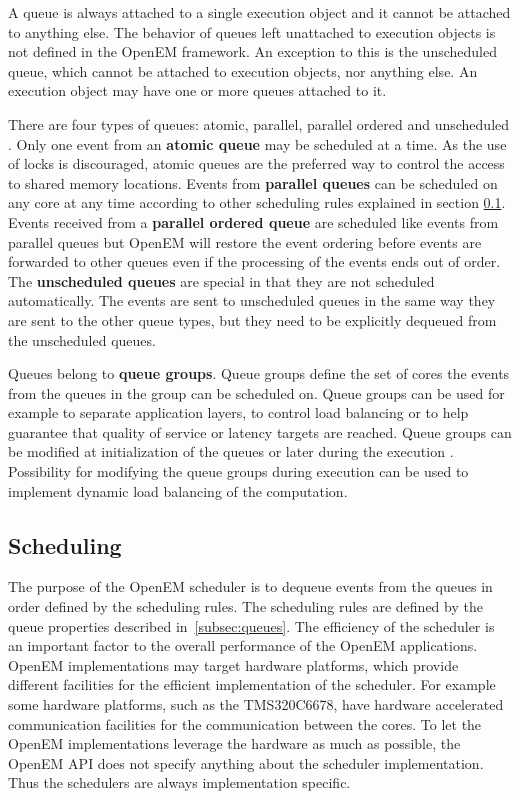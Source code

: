 A queue is always attached to a single execution object and it cannot be attached to anything else. The behavior of queues left unattached to execution objects is not defined in the OpenEM framework. An exception to this is the unscheduled queue, which cannot be attached to execution objects, nor anything else. An execution object may have one or more queues attached to it.~\cite{openemintro}

There are four types of queues: atomic, parallel, parallel ordered and unscheduled \cite{openemintro}. Only one event from an \textbf{atomic queue} may be scheduled at a time. As the use of locks is discouraged, atomic queues are the preferred way to control the access to shared memory locations. Events from \textbf{parallel queues} can be scheduled on any core at any time according to other scheduling rules explained in section \ref{subsec:schedule}. Events received from a \textbf{parallel ordered queue} are scheduled like events from parallel queues but OpenEM will restore the event ordering before events are forwarded to other queues even if the processing of the events ends out of order. The \textbf{unscheduled queues} are special in that they are not scheduled automatically. The events are sent to unscheduled queues in the same way they are sent to the other queue types, but they need to be explicitly dequeued from the unscheduled queues.~\cite{openempage}

Queues belong to \textbf{queue groups}. Queue groups define the set of cores the events from the queues in the group can be scheduled on. Queue groups can be used for example to separate application layers, to control load balancing or to help guarantee that quality of service or latency targets are reached. \cite{openemintro} Queue groups can be modified at initialization of the queues or later during the execution \cite{openempage}. Possibility for modifying the queue groups during execution can be used to implement dynamic load balancing of the computation.

\subsection{Scheduling}
\label{subsec:schedule}
The purpose of the OpenEM scheduler is to dequeue events from the queues in order defined by the scheduling rules. The scheduling rules are defined by the queue properties described in~\ref{subsec:queues}. The efficiency of the scheduler is an important factor to the overall performance of the OpenEM applications.~\cite{openempage} OpenEM implementations may target hardware platforms, which provide different facilities for the efficient implementation of the scheduler. For example some hardware platforms, such as the TMS320C6678, have hardware accelerated communication facilities for the communication between the cores. To let the OpenEM implementations leverage the hardware as much as possible, the OpenEM API does not specify anything about the scheduler implementation. Thus the schedulers are always implementation specific.

